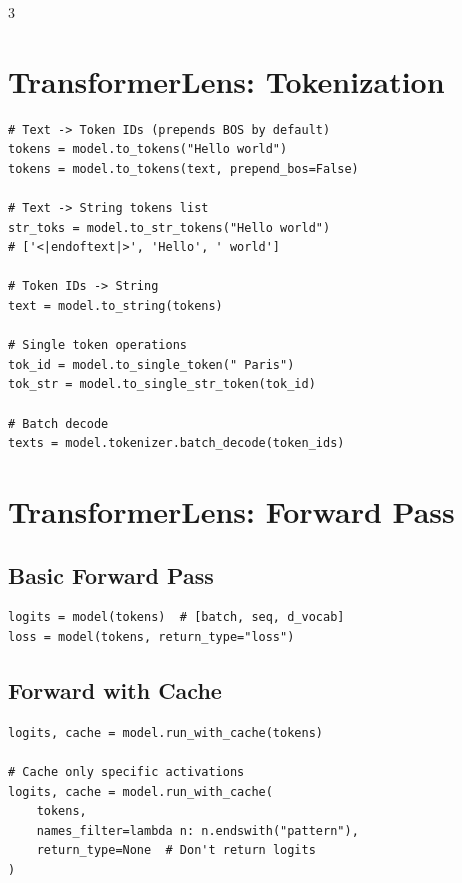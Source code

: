 \documentclass[10pt,a4paper,landscape]{article}
\begin{document}
\begin{multicols}{3}
\section{TransformerLens: Tokenization}

\begin{lstlisting}
# Text -> Token IDs (prepends BOS by default)
tokens = model.to_tokens("Hello world")
tokens = model.to_tokens(text, prepend_bos=False)

# Text -> String tokens list
str_toks = model.to_str_tokens("Hello world")
# ['<|endoftext|>', 'Hello', ' world']

# Token IDs -> String
text = model.to_string(tokens)

# Single token operations
tok_id = model.to_single_token(" Paris")
tok_str = model.to_single_str_token(tok_id)

# Batch decode
texts = model.tokenizer.batch_decode(token_ids)
\end{lstlisting}

\section{TransformerLens: Forward Pass}

\subsection{Basic Forward Pass}
\begin{lstlisting}
logits = model(tokens)  # [batch, seq, d_vocab]
loss = model(tokens, return_type="loss")
\end{lstlisting}

\subsection{Forward with Cache}
\begin{lstlisting}
logits, cache = model.run_with_cache(tokens)

# Cache only specific activations
logits, cache = model.run_with_cache(
    tokens,
    names_filter=lambda n: n.endswith("pattern"),
    return_type=None  # Don't return logits
)
\end{lstlisting}


\end{multicols}
\end{document}

